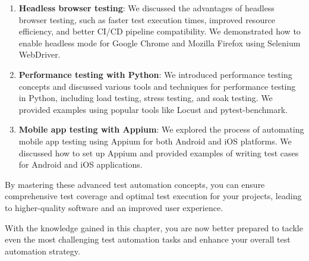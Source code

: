 \documentclass[
  paper=a4,
  ,captions=tableheading
]{scrartcl}
\begin{document}
\begin{enumerate}
\def\labelenumi{\arabic{enumi}.}
\item
  \textbf{Headless browser testing}: We discussed the advantages of
  headless browser testing, such as faster test execution times,
  improved resource efficiency, and better CI/CD pipeline compatibility.
  We demonstrated how to enable headless mode for Google Chrome and
  Mozilla Firefox using Selenium WebDriver.
\item
  \textbf{Performance testing with Python}: We introduced performance
  testing concepts and discussed various tools and techniques for
  performance testing in Python, including load testing, stress testing,
  and soak testing. We provided examples using popular tools like Locust
  and pytest-benchmark.
\item
  \textbf{Mobile app testing with Appium}: We explored the process of
  automating mobile app testing using Appium for both Android and iOS
  platforms. We discussed how to set up Appium and provided examples of
  writing test cases for Android and iOS applications.
\end{enumerate}

By mastering these advanced test automation concepts, you can ensure
comprehensive test coverage and optimal test execution for your
projects, leading to higher-quality software and an improved user
experience.

With the knowledge gained in this chapter, you are now better prepared
to tackle even the most challenging test automation tasks and enhance
your overall test automation strategy.
\end{document}
